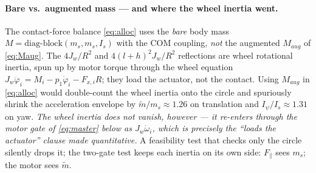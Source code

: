 \documentclass[11pt]{article}
\begin{document}
\paragraph{Bare vs.\ augmented mass --- and where the wheel inertia went.} The contact-force balance
\eqref{eq:alloc} uses the \emph{bare} body mass $M=\mathrm{diag\text{-}block}(m_s,m_s,I_s)$ with the
COM coupling, \emph{not} the augmented $M_{aug}$ of \eqref{eq:Maug}. The $4J_w/R^2$ and
$4(l+h)^2J_w/R^2$ reflections are wheel rotational inertia, spun up by motor torque through the
wheel equation $J_w\ddot\varphi_i=M_i-p_1\dot\varphi_i-F_{x,i}R$; they load the actuator, not the
contact. Using $M_{aug}$ in \eqref{eq:alloc} would double-count the wheel inertia onto the circle
and spuriously shrink the acceleration envelope by $\tilde m/m_s\approx1.26$ on translation and
$I_\psi/I_s\approx1.31$ on yaw. \emph{The wheel inertia does not vanish, however --- it re-enters
through the motor gate of \eqref{eq:master} below as $J_w\dot\omega_i$, which is precisely the
``loads the actuator'' clause made quantitative.} A feasibility test that checks only the circle
silently drops it; the two-gate test keeps each inertia on its own side:
$F_\parallel$ sees $m_s$; the motor sees $\tilde m$.
\end{document}
